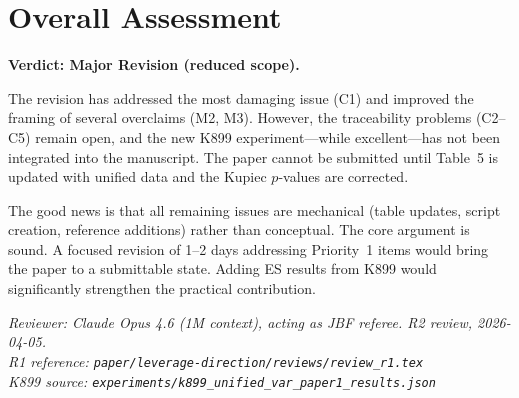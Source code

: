\documentclass[12pt,a4paper]{article}
\begin{document}
\bigskip

\section*{Overall Assessment}

\textbf{Verdict: Major Revision (reduced scope).}

The revision has addressed the most damaging issue (C1) and improved the framing of several overclaims (M2, M3). However, the traceability problems (C2--C5) remain open, and the new K899 experiment---while excellent---has not been integrated into the manuscript. The paper cannot be submitted until Table~5 is updated with unified data and the Kupiec $p$-values are corrected.

The good news is that all remaining issues are mechanical (table updates, script creation, reference additions) rather than conceptual. The core argument is sound. A focused revision of 1--2 days addressing Priority~1 items would bring the paper to a submittable state. Adding ES results from K899 would significantly strengthen the practical contribution.

\bigskip

\noindent\textit{Reviewer: Claude Opus 4.6 (1M context), acting as JBF referee. R2 review, 2026-04-05.}\\
\noindent\textit{R1 reference: \texttt{paper/leverage-direction/reviews/review\_r1.tex}}\\
\noindent\textit{K899 source: \texttt{experiments/k899\_unified\_var\_paper1\_results.json}}
\end{document}
